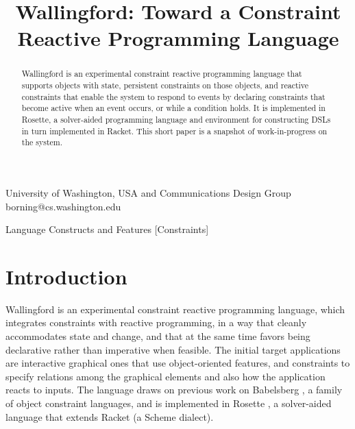\documentclass{sigplanconf}
\begin{document}
\toappear{}
\sloppy

\setlength{\pdfpageheight}{\paperheight}
\setlength{\pdfpagewidth}{\paperwidth}


\title{Wallingford: Toward a Constraint \\  Reactive Programming Language}

{University of Washington, USA and Communications Design Group}
{borning@cs.washington.edu}

\maketitle

\begin{abstract}
Wallingford is an experimental constraint reactive programming language
that supports objects with state, persistent constraints on those objects,
and reactive constraints that enable the system to respond to events by
declaring constraints that become active when an event occurs, or while a
condition holds.  It is implemented in Rosette, a solver-aided programming
language and environment for constructing DSLs in turn implemented in
Racket.  This short paper is a snapshot of work-in-progress on the system.

\end{abstract}

         {Language Constructs and Features}
         [Constraints]


\section{Introduction}

Wallingford is an experimental constraint reactive programming
language, which integrates constraints with reactive programming, in a
way that cleanly accommodates state and change, and that at the same
time favors being declarative rather than imperative when feasible.
The initial target applications are interactive graphical ones that
use object-oriented features, and constraints to specify relations
among the graphical elements and also how the application reacts to
inputs.  The language draws on previous work on Babelsberg
\cite{FelgentreffJOT14,felgentreff-oopsla-2015}, a family of
object constraint languages, and is implemented in Rosette
\cite{torlak-onward-2013,torlak-pldi-2014}, a
solver-aided language that extends Racket (a Scheme dialect).
\end{document}
